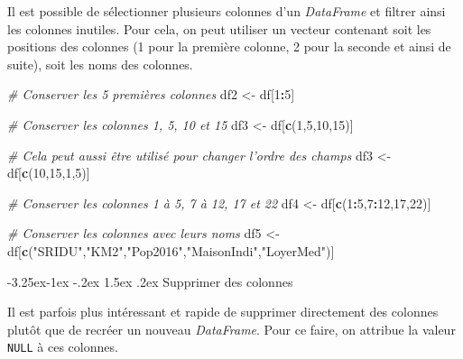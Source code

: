 \documentclass[
  11pt,
  french,
]{book}
\makeatletter
\newenvironment{Shaded}{\begin{snugshade}}{\end{snugshade}}
\newcommand{\CommentTok}[1]{\textcolor[rgb]{0.56,0.35,0.01}{\textit{#1}}}
\newcommand{\DecValTok}[1]{\textcolor[rgb]{0.00,0.00,0.81}{#1}}
\newcommand{\KeywordTok}[1]{\textcolor[rgb]{0.13,0.29,0.53}{\textbf{#1}}}
\newcommand{\NormalTok}[1]{#1}
\newcommand{\OperatorTok}[1]{\textcolor[rgb]{0.81,0.36,0.00}{\textbf{#1}}}
\newcommand{\StringTok}[1]{\textcolor[rgb]{0.31,0.60,0.02}{#1}}
\newenvironment{kframe}{%
\medskip{}
\setlength{\fboxsep}{.8em}
 \def\at@end@of@kframe{}%
 \ifinner\ifhmode%
  \def\at@end@of@kframe{\end{minipage}}%
  \begin{minipage}{\columnwidth}%
 \fi\fi%
 \def\FrameCommand##1{\hskip\@totalleftmargin \hskip-\fboxsep
 \colorbox{shadecolor}{##1}\hskip-\fboxsep
     \hskip-\linewidth \hskip-\@totalleftmargin \hskip\columnwidth}%
 \MakeFramed {\advance\hsize-\width
   \@totalleftmargin\z@ \linewidth\hsize
   \@setminipage}}%
 {\par\unskip\endMakeFramed%
 \at@end@of@kframe}
\renewenvironment{Shaded}{\begin{kframe}}{\end{kframe}}
\renewcommand\paragraph{\@startsection{paragraph}{4}{\z@}%
   {-3.25ex\@plus -1ex \@minus -.2ex}%
   {1.5ex \@plus .2ex}%
   {\normalfont\normalsize\bfseries}}
\makeatother
\begin{document}
Il est possible de sélectionner plusieurs colonnes d'un \emph{DataFrame} et filtrer ainsi les colonnes inutiles. Pour cela, on peut utiliser un vecteur contenant soit les positions des colonnes (1 pour la première colonne, 2 pour la seconde et ainsi de suite), soit les noms des colonnes.

\begin{Shaded}
\begin{Highlighting}[]
\CommentTok{# Conserver les 5 premières colonnes}
\NormalTok{df2 <-}\StringTok{ }\NormalTok{df[}\DecValTok{1}\OperatorTok{:}\DecValTok{5}\NormalTok{]}

\CommentTok{# Conserver les colonnes 1, 5, 10 et 15}
\NormalTok{df3 <-}\StringTok{ }\NormalTok{df[}\KeywordTok{c}\NormalTok{(}\DecValTok{1}\NormalTok{,}\DecValTok{5}\NormalTok{,}\DecValTok{10}\NormalTok{,}\DecValTok{15}\NormalTok{)]}

\CommentTok{# Cela peut aussi être utilisé pour changer l'ordre des champs}
\NormalTok{df3 <-}\StringTok{ }\NormalTok{df[}\KeywordTok{c}\NormalTok{(}\DecValTok{10}\NormalTok{,}\DecValTok{15}\NormalTok{,}\DecValTok{1}\NormalTok{,}\DecValTok{5}\NormalTok{)]}

\CommentTok{# Conserver les colonnes 1 à 5, 7 à 12, 17 et 22}
\NormalTok{df4 <-}\StringTok{ }\NormalTok{df[}\KeywordTok{c}\NormalTok{(}\DecValTok{1}\OperatorTok{:}\DecValTok{5}\NormalTok{,}\DecValTok{7}\OperatorTok{:}\DecValTok{12}\NormalTok{,}\DecValTok{17}\NormalTok{,}\DecValTok{22}\NormalTok{)]}

\CommentTok{# Conserver les colonnes avec leurs noms}
\NormalTok{df5 <-}\StringTok{ }\NormalTok{df[}\KeywordTok{c}\NormalTok{(}\StringTok{"SRIDU"}\NormalTok{,}\StringTok{"KM2"}\NormalTok{,}\StringTok{"Pop2016"}\NormalTok{,}\StringTok{"MaisonIndi"}\NormalTok{,}\StringTok{"LoyerMed"}\NormalTok{)]}
\end{Highlighting}
\end{Shaded}

\hypertarget{sect014223}{%
\paragraph{Supprimer des colonnes}\label{sect014223}}

Il est parfois plus intéressant et rapide de supprimer directement des colonnes plutôt que de recréer un nouveau \emph{DataFrame}. Pour ce faire, on attribue la valeur \texttt{NULL} à ces colonnes.
\end{document}
